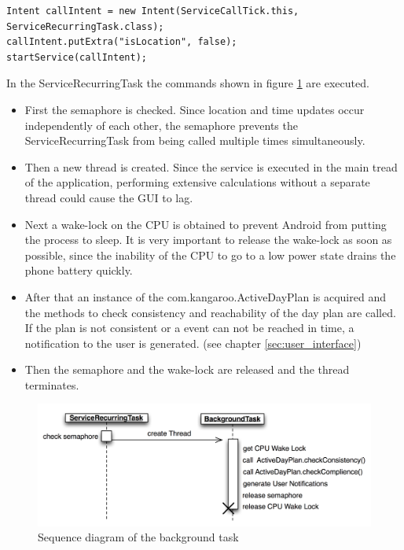  \begin{verbatim}  
Intent callIntent = new Intent(ServiceCallTick.this, ServiceRecurringTask.class);
callIntent.putExtra("isLocation", false);
startService(callIntent);
\end{verbatim}
In the ServiceRecurringTask the commands shown in figure \ref{background2} are executed.
\begin{itemize}
\item First the semaphore is checked. Since location and time updates occur independently of each other, the semaphore prevents the ServiceRecurringTask from being called multiple times simultaneously. 
\item Then a new thread is created. Since the service is executed in the main tread of the application, performing extensive calculations without a separate thread could cause the GUI to lag. 
\item Next a wake-lock on the CPU is obtained to prevent Android from putting the process to sleep. It is very important to release the wake-lock as soon as possible, since the inability of the CPU to go to a low power state drains the phone battery quickly. 
\item After that an instance of the com.kangaroo.ActiveDayPlan is acquired and the methods to check consistency and reachability of the day plan are called. If the plan is not consistent or a event can not be reached in time, a notification to the user is generated. (see chapter \ref{sec:user_interface}) 
\item Then the semaphore and the wake-lock are released and the thread terminates.
\end{itemize}
\begin{figure}[h!]
\centering
\includegraphics[width=14cm]{pics/background2.png}
\caption{Sequence diagram of the background task}
\label{background2}
\end{figure}  
